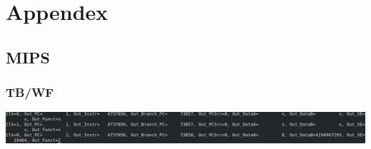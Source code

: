 \documentclass{llncs}
\begin{document}
\section{Appendex}
\subsection{MIPS}
\label{mips:1}
\begin{addmargin}[-5em]{-2em}

\end{addmargin}
\subsubsection{TB/WF}
\begin{addmargin}[-5em]{-2em}
  
\end{addmargin}
\includegraphics[scale=.2]{images/mipstb.png}
\end{document}
